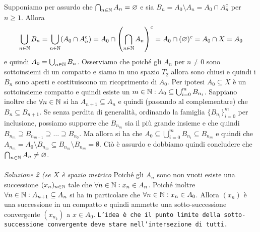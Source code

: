Supponiamo per assurdo che $ \bigcap_{n \in \mathbb{N}} A_n = \varnothing $ e sia $ B_n = A_0 \setminus A_n = A_0 \cap A_n^c $ per $ n \geq 1 $. Allora \[\bigcup_{n \in \mathbb{N}} B_n = \bigcup_{n \in \mathbb{N}} (A_0 \cap A_n^c) = A_0 \cap \left(\bigcap_{n \in \mathbb{N}} A_n\right)^c = A_0 \cap (\varnothing)^c = A_0 \cap X = A_0\] e quindi $ A_0 = \bigcup_{n \in \N} B_n $. Osserviamo che poiché gli $ A_n $ per $ n \neq 0 $ sono sottoinsiemi di un compatto e siamo in uno spazio $ T_2 $ allora sono chiusi e quindi i $ B_n $ sono aperti e costituiscono un ricoprimento di $ A_0 $. Per ipotesi $ A_0 \subseteq X $ è un sottoinsieme compatto e quindi esiste un $ m \in \mathbb{N} : A_0 \subseteq \bigcup_{i = 0}^{m} B_{n_{i}} $. Sappiano inoltre che $ \forall n \in \mathbb{N} $ si ha $ A_{n + 1} \subseteq A_n $ e quindi (passando al complementare) che $ B_{n} \subseteq B_{n + 1} $. Se senza perdita di generalità, ordinando la famiglia $ \{B_{n_i}\}_{i = 0}^{m} $ per inclusione, possiamo supporre che $ B_{n_m} $ sia il più grande insieme e che quindi $ B_{n_m} \supseteq B_{n_{m - 1}} \supseteq \ldots \supseteq B_{n_0} $. Ma allora si ha che $ A_0 \subseteq \bigcup_{i = 0}^{m} B_{n_{i}} \subseteq B_{n_m} $ e quindi che $ A_{n_m} = A_0 \setminus B_{n_m} \subseteq B_{n_m} \setminus B_{n_m} = \emptyset $. Ciò è assurdo e dobbiamo quindi concludere che $ \bigcap_{n \in \mathbb{N}} A_n \neq \varnothing $. \\
\iffalse
Sia come prima $ B_n = A_0 \setminus A_n $. Allora si ha che $ A_0 = \bigcup_{n \in \N} B_n $ e che $ \exists m \in \N : A_0 \subseteq \bigcup_{i = 0}^{m} B_{n_{i}} $. Allora, passando all'unione finita si ha che \[\bigcup_{n \leq N} B_n = A_0 \setminus \bigcap_{n \leq N} A_n \quad \Rightarrow \quad \bigcap_{n \leq N} A_n = A_0 \setminus \bigcup_{n \leq N} B_n \subseteq \bigcup_{i = 0}^{m} B_{n_{i}} \setminus \bigcup_{n \leq N} B_n\] e quindi preso $ N \geq m $ si ha che $ \bigcap_{n \leq N} A_n = \emptyset $. \\
\fi
\\
\emph{Soluzione 2 (se $ X $ è spazio metrico} Poiché gli $ A_n $ sono non vuoti esiste una successione $ (x_n)_{n \in \mathbb{N}} $ tale che $ \forall n \in \mathbb{N} : x_n \in A_n $. Poiché inoltre $ \forall n \in \mathbb{N} : A_{n + 1} \subseteq A_{n} $ si ha in particolare che $ \forall n \in \mathbb{N} : x_n \in A_0 $. Allora $ (x_n) $ è una successione in un compatto e quindi ammette una sotto-successione convergente $ (x_{n_k}) $ a $ x \in A_0 $. \texttt{L'idea è che il punto limite della sotto-successione convergente deve stare nell'intersezione di tutti.}

